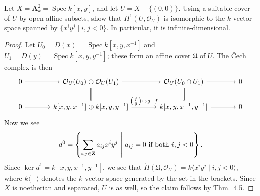 \documentclass[10pt]{article}
\theoremstyle{definition}
\theoremstyle{remark}
\numberwithin{equation}{section}
\numberwithin{figure}{subsubsection}
\let\Im\relax
\DeclareMathOperator{\Im}{im}
\DeclareMathOperator{\Spec}{Spec}
\newcommand{\OO}{\mathcal{O}}
\begin{document}
\setcounter{subsubsection}{2}
\begin{problem}
  Let $X = \mathbf{A}^2_k = \Spec k[x,y]$, and let $U = X - \{(0,0)\}$. Using a
  suitable cover of $U$ by open affine subsets, show that $H^1(U,\OO_U)$ is
  isomorphic to the $k$-vector space spanned by $\{x^iy^j \mid i,j < 0\}$. In
  particular, it is infinite-dimensional.
\end{problem}
\begin{proof}
  Let $U_0 = D(x) = \Spec k[x,y,x^{-1}]$ and $U_1 = D(y) = \Spec k[x,y,y^{-1}]$;
  these form an affine cover $\mathfrak{U}$ of $U$. The \v{C}ech complex is
  then
  \begin{equation*}
    \begin{tikzcd}[column sep=large]
      0 \rar & \OO_U(U_0) \oplus \OO_U(U_1) \rar
      \dar[equal] & \OO_U(U_0 \cap U_1) \rar\dar[equal] & 0\\
      0 \rar & k[x,y,x^{-1}] \oplus k[x,y,y^{-1}]
      \rar{\left(\begin{smallmatrix}f\\g\end{smallmatrix}\right) \mapsto g-f}&
      k[x,y,x^{-1},y^{-1}] \rar & 0
    \end{tikzcd}
  \end{equation*}
  Now we see
  \begin{equation*}
    \Im d^0 = \left\{ \sum_{i,j \in \mathbf{Z}} a_{ij}x^iy^j\ \middle\vert\ 
    a_{ij} = 0\ \text{if both}\ i,j < 0\right\}.
  \end{equation*}
  Since $\ker d^1 = k[x,y,x^{-1},y^{-1}]$, we see that
  $\check{H}(\mathfrak{U},\OO_U) = k\langle x^iy^j \mid i,j < 0 \rangle$, where
  $k\langle-\rangle$ denotes the $k$-vector space generated by the set in
  the brackets. Since $X$ is noetherian and separated, $U$ is as well, so the
  claim follows by Thm.\ 4.5.
\end{proof}
\end{document}
